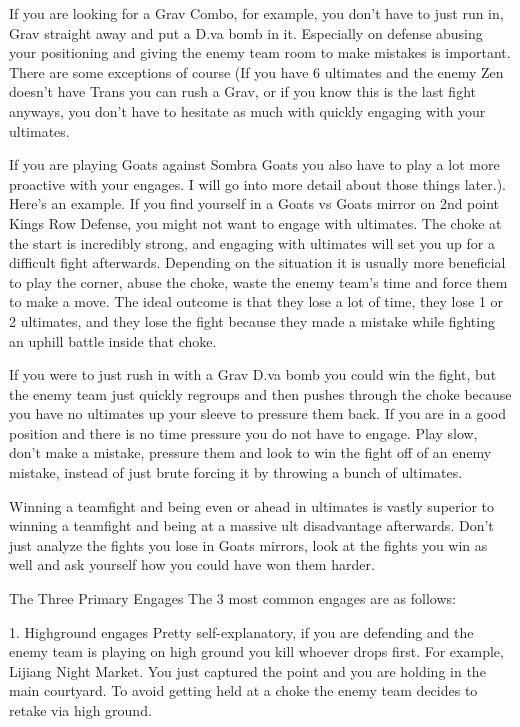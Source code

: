 If you are looking for a Grav Combo, for example, you don’t have to just run in, Grav straight away and put a D.va bomb in it. Especially on defense abusing your positioning and giving the enemy team room to make mistakes is important. There are some exceptions of course (If you have 6 ultimates and the enemy Zen doesn’t have Trans you can rush a Grav, or if you know this is the last fight anyways, you don’t have to hesitate as much with quickly engaging with your ultimates.

If you are playing Goats against Sombra Goats you also have to play a lot more proactive with your engages. I will go into more detail about those things later.). Here’s an example. If you find yourself in a Goats vs Goats mirror on 2nd point Kings Row Defense, you might not want to engage with ultimates. The choke at the start is incredibly strong, and engaging with ultimates will set you up for a difficult fight afterwards.
Depending on the situation it is usually more beneficial to play the corner, abuse the choke, waste the enemy team's time and force them to make a move. The ideal outcome is that they lose a lot of time, they lose 1 or 2 ultimates, and they lose the fight because they made a mistake while fighting an uphill battle inside that choke.

If you were to just rush in with a Grav D.va bomb you could win the fight, but the enemy team just quickly regroups and then pushes through the choke because you have no ultimates up your sleeve to pressure them back. If you are in a good position and there is no time pressure you do not have to engage. Play slow, don’t make a mistake, pressure them and look to win the fight off of an enemy mistake, instead of just brute forcing it by throwing a bunch of ultimates. 

Winning a teamfight and being even or ahead in ultimates is vastly superior to winning a teamfight and being at a massive ult disadvantage afterwards. Don’t just analyze the fights you lose in Goats mirrors, look at the fights you win as well and ask yourself how you could have won them harder.












The Three Primary Engages
The 3 most common engages are as follows:

1. Highground engages
    Pretty self-explanatory, if you are defending and the enemy team is playing on high ground you kill whoever drops first. For example, Lijiang Night Market. You just captured the point and you are holding in the main courtyard. To avoid getting held at a choke the enemy team decides to retake via high ground.

